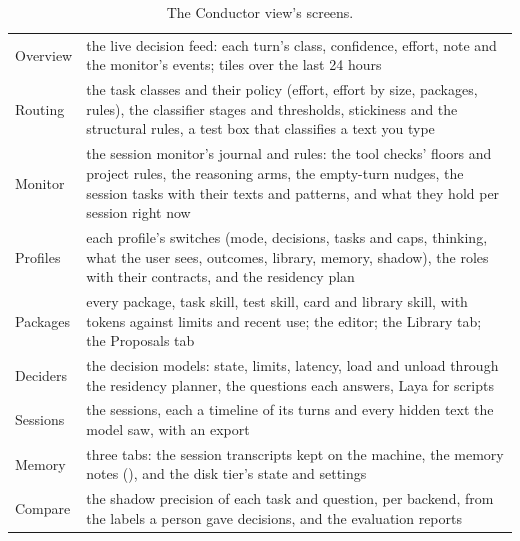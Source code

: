 \begin{table}[htbp]
\centering\small
\caption{The Conductor view's screens.}\label{tab:conductor-screens}
\begin{tabularx}{\linewidth}{@{}L{.14\linewidth}Y@{}}
\toprule
{} &  \\
\midrule
Overview & the live decision feed: each turn's class, confidence, effort, note and the monitor's events; tiles over the last 24 hours \\
Routing & the task classes and their policy (effort, effort by size, packages, rules), the classifier stages and thresholds, stickiness and the structural rules, a test box that classifies a text you type \\
Monitor & the session monitor's journal and rules: the tool checks' floors and project rules, the reasoning arms, the empty-turn nudges, the session tasks with their texts and patterns, and what they hold per session right now \\
Profiles & each profile's switches (mode, decisions, tasks and caps, thinking, what the user sees, outcomes, library, memory, shadow), the roles with their contracts, and the residency plan \\
Packages & every package, task skill, test skill, card and library skill, with tokens against limits and recent use; the editor; the Library tab; the Proposals tab \\
Deciders & the decision models: state, limits, latency, load and unload through the residency planner, the questions each answers, Laya for scripts \\
Sessions & the sessions, each a timeline of its turns and every hidden text the model saw, with an export \\
Memory & three tabs: the session transcripts kept on the machine, the memory notes (), and the disk tier's state and settings \\
Compare & the shadow precision of each task and question, per backend, from the labels a person gave decisions, and the evaluation reports \\
\bottomrule
\end{tabularx}
\end{table}


